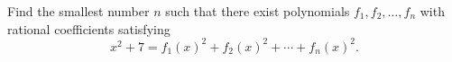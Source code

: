 Find the smallest number $n$ such that there exist polynomials $f_1, f_2, \ldots, f_n$ with rational coefficients satisfying \[ x^2 + 7 = f_1(x)^2 + f_2(x)^2 + \cdots + f_n(x)^2. \]
